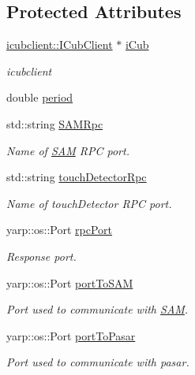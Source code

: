 \subsection*{Protected Attributes}
\begin{DoxyCompactItemize}
\item 
\hyperlink{group__icubclient__clients_classicubclient_1_1ICubClient}{icubclient\+::\+I\+Cub\+Client} $\ast$ \hyperlink{classproactiveTagging_af0a6a3c8dd1504920ca362a55defadb2}{i\+Cub}
\begin{DoxyCompactList}\small\item\em icubclient \end{DoxyCompactList}\item 
double \hyperlink{classproactiveTagging_a50ac9c7c0744e710bdcc51bd931a4b0e}{period}
\item 
std\+::string \hyperlink{classproactiveTagging_a9f26b33c30966d628ecdd89cd953c852}{S\+A\+M\+Rpc}
\begin{DoxyCompactList}\small\item\em Name of \hyperlink{namespaceSAM}{S\+AM} R\+PC port. \end{DoxyCompactList}\item 
std\+::string \hyperlink{classproactiveTagging_aaaaed95ad0d6607683ab8451d6a90abf}{touch\+Detector\+Rpc}
\begin{DoxyCompactList}\small\item\em Name of touch\+Detector R\+PC port. \end{DoxyCompactList}\item 
yarp\+::os\+::\+Port \hyperlink{classproactiveTagging_a7f2ff11627a9a75f56b33ac626b3a252}{rpc\+Port}
\begin{DoxyCompactList}\small\item\em Response port. \end{DoxyCompactList}\item 
yarp\+::os\+::\+Port \hyperlink{classproactiveTagging_a0b64adf975edfe871cf4816b824e8cf0}{port\+To\+S\+AM}
\begin{DoxyCompactList}\small\item\em Port used to communicate with \hyperlink{namespaceSAM}{S\+AM}. \end{DoxyCompactList}\item 
yarp\+::os\+::\+Port \hyperlink{classproactiveTagging_a94a5997938a3b60d47c7feb179a93888}{port\+To\+Pasar}
\begin{DoxyCompactList}\small\item\em Port used to communicate with pasar. \end{DoxyCompactList}\item 

\end{DoxyCompactItemize}
